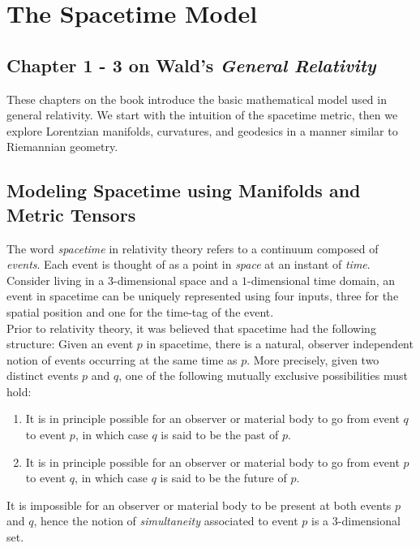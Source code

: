 \documentclass[11pt, onesided]{book}
\theoremstyle{break}
\theoremstyle{break}
\begin{document}
\tableofcontents
\hfill\break
\hfill\break
\hfill\break
 


\newpage
\chapter{The Spacetime Model}
\section*{Chapter 1 - 3 on Wald's \textit{General Relativity}}
These chapters on the book introduce the basic mathematical model used in general relativity. We start with the intuition of the spacetime metric, then we explore Lorentzian manifolds, curvatures, and geodesics in a manner similar to Riemannian geometry. 
\hfill\break
\hfill\break


\section[Modeling Spacetime using Manifolds and Metric Tensors]{\color{red}Modeling Spacetime using Manifolds and Metric Tensors\color{black}}
The word \textit{spacetime} in relativity theory refers to a continuum composed of \textit{events}. Each event is thought of as a point in \textit{space} at an instant of \textit{time}. Consider living in a $3$-dimensional space and a $1$-dimensional time domain, an event in spacetime can be uniquely represented using four inputs, three for the spatial position and one for the time-tag of the event.\\

Prior to relativity theory, it was believed that spacetime had the following structure: Given an event $p$ in spacetime, there is a natural, observer independent notion of events occurring at the same time as $p$. More precisely, given two distinct events $p$ and $q$, one of the following mutually exclusive possibilities must hold:
\begin{enumerate}[topsep=3pt,itemsep=-1ex,partopsep=1ex,parsep=1ex]
\item It is in principle possible for an observer or material body to go from event $q$ to event $p$, in which case $q$ is said to be the past of $p$.
\item It is in principle possible for an observer or material body to go from event $p$ to event $q$, in which case $q$ is said to be the future of $p$. 
\end{enumerate}
It is impossible for an observer or material body to be present at both events $p$ and $q$, hence the notion of \textit{simultaneity} associated to event $p$ is a $3$-dimensional set. \\
\end{document}
